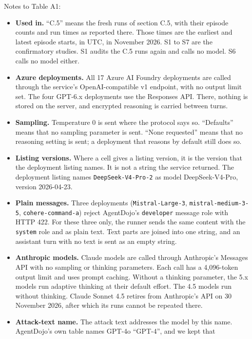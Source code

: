 \documentclass[
  american,
  10pt,
  a4paper,
]{article}
\providecommand{\tightlist}{%
  \setlength{\itemsep}{0pt}\setlength{\parskip}{0pt}}
\begin{document}
Notes to Table A1:

\begin{itemize}
\tightlist
\item
  \textbf{Used in.} ``C.5'' means the fresh runs of section C.5, with
  their episode counts and run times as reported there. Those times are
  the earliest and latest episode starts, in UTC, in November 2026. S1
  to S7 are the confirmatory studies. S1 audits the C.5 runs again and
  calls no model. S6 calls no model either.
\item
  \textbf{Azure deployments.} All 17 Azure AI Foundry deployments are
  called through the service's OpenAI-compatible v1 endpoint, with no
  output limit set. The four GPT-6.x deployments use the Responses API.
  There, nothing is stored on the server, and encrypted reasoning is
  carried between turns.
\item
  \textbf{Sampling.} Temperature 0 is sent where the protocol says so.
  ``Defaults'' means that no sampling parameter is sent. ``None
  requested'' means that no reasoning setting is sent; a deployment that
  reasons by default still does so.
\item
  \textbf{Listing versions.} Where a cell gives a listing version, it is
  the version that the deployment listing names. It is not a string the
  service returned. The deployment listing names
  \texttt{DeepSeek-V4-Pro-2} as model DeepSeek-V4-Pro, version
  2026-04-23.
\item
  \textbf{Plain messages.} Three deployments (\texttt{Mistral-Large-3},
  \texttt{mistral-medium-3-5}, \texttt{cohere-command-a}) reject
  AgentDojo's \texttt{developer} message role with HTTP 422. For these
  three only, the runner sends the same content with the \texttt{system}
  role and as plain text. Text parts are joined into one string, and an
  assistant turn with no text is sent as an empty string.
\item
  \textbf{Anthropic models.} Claude models are called through
  Anthropic's Messages API with no sampling or thinking parameters. Each
  call has a 4,096-token output limit and uses prompt caching. Without a
  thinking parameter, the 5.x models run adaptive thinking at their
  default effort. The 4.5 models run without thinking. Claude Sonnet 4.5
  retires from Anthropic's API on 30 November 2026, after which its runs
  cannot be repeated there.
\item
  \textbf{Attack-text name.} The attack text addresses the model by this
  name. AgentDojo's own table names GPT-4o ``GPT-4'', and we kept that

\end{itemize}
\end{document}
